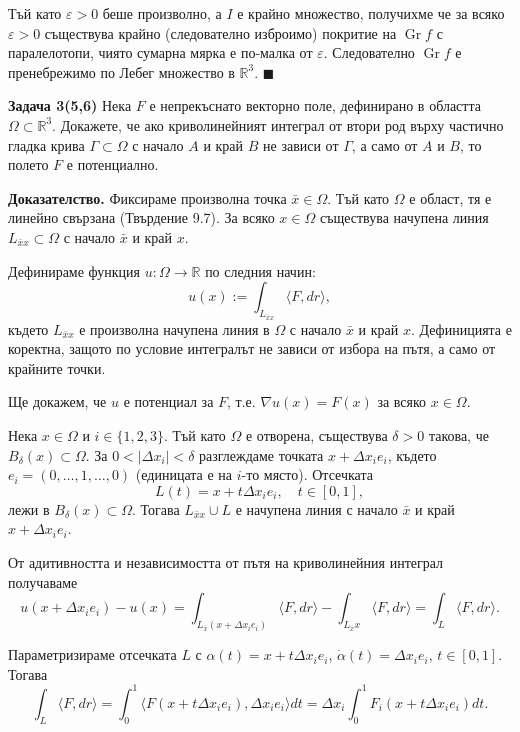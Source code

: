 \documentclass[10pt]{article}
\begin{document}
Тъй като $\varepsilon > 0$ беше произволно, а $I$ е крайно множество, получихме че за всяко $\varepsilon > 0$ съществува крайно (следователно изброимо) покритие на $\operatorname{Gr}f$ с паралелотопи, чиято сумарна мярка е по-малка от $\varepsilon$. Следователно $\operatorname{Gr}f$ е пренебрежимо по Лебег множество в $\mathbb{R}^3$. $\blacksquare$


\textbf{Задача 3(5,6) }Нека $F$ е непрекъснато векторно поле, дефинирано в областта $\Omega \subset \mathbb{R}^3$. Докажете, че ако криволинейният интеграл от втори род върху частично гладка крива $\Gamma \subset \Omega$ с начало $A$ и край $B$ не зависи от $\Gamma$, а само от $A$ и $B$, то полето $F$ е потенциално.

\textbf{Доказателство.} 
Фиксираме произволна точка $\bar{x} \in \Omega$. Тъй като $\Omega$ е област, тя е линейно свързана (Твърдение 9.7). За всяко $x \in \Omega$ съществува начупена линия $L_{\bar{x}x} \subset \Omega$ с начало $\bar{x}$ и край $x$.

Дефинираме функция $u : \Omega \to \mathbb{R}$ по следния начин:
\[
u(x) := \int_{L_{\bar{x}x}} \langle F, dr \rangle,
\]
където $L_{\bar{x}x}$ е произволна начупена линия в $\Omega$ с начало $\bar{x}$ и край $x$. Дефиницията е коректна, защото по условие интегралът не зависи от избора на пътя, а само от крайните точки.

Ще докажем, че $u$ е потенциал за $F$, т.е. $\nabla u(x) = F(x)$ за всяко $x \in \Omega$.

Нека $x \in \Omega$ и $i \in \{1,2,3\}$. Тъй като $\Omega$ е отворена, съществува $\delta > 0$ такова, че $B_\delta(x) \subset \Omega$. За $0 < |\Delta x_i| < \delta$ разглеждаме точката $x + \Delta x_i e_i$, където $e_i = (0,\dots,1,\dots,0)$ (единицата е на $i$-то място). Отсечката
\[
L(t) = x + t\Delta x_i e_i, \quad t \in [0,1],
\]
лежи в $B_\delta(x) \subset \Omega$. Тогава $L_{\bar{x}x} \cup L$ е начупена линия с начало $\bar{x}$ и край $x + \Delta x_i e_i$.

От адитивността и независимостта от пътя на криволинейния интеграл получаваме
\[
u(x+\Delta x_i e_i) - u(x) = \int_{L_{\bar{x}}(x+\Delta x_i e_i)} \langle F, dr \rangle - \int_{L_{\bar{x}}x} \langle F, dr \rangle = \int_{L} \langle F, dr \rangle.
\]

Параметризираме отсечката $L$ с $\alpha(t) = x + t\Delta x_i e_i$, $\dot{\alpha}(t) = \Delta x_i e_i$, $t \in [0,1]$. Тогава
\[
\int_{L} \langle F, dr \rangle = \int_0^1 \langle F(x + t\Delta x_i e_i), \Delta x_i e_i \rangle dt = \Delta x_i \int_0^1 F_i(x + t\Delta x_i e_i) dt.
\]
\end{document}
